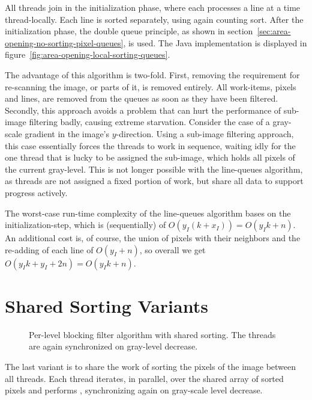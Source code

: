 All threads join in the initialization phase, where each processes a line at a
time thread-locally. Each line is sorted separately, using again counting
sort. After the initialization phase, the double queue principle, as shown in
section~\ref{sec:area-opening-no-sorting-pixel-queues}, is used. The Java
implementation is displayed in
figure~\ref{fig:area-opening-local-sorting-queues}.

The advantage of this algorithm is two-fold. First, removing the requirement for
re-scanning the image, or parts of it, is removed entirely. All work-items,
pixels and lines, are removed from the queues as soon as they have been
filtered. Secondly, this approach avoids a problem that can hurt the performance
of sub-image filtering badly, causing extreme starvation. Consider the case of a
gray-scale gradient in the image's $y$-direction. Using a sub-image filtering
approach, this case essentially forces the threads to work in sequence, waiting
idly for the one thread that is lucky to be assigned the sub-image, which holds
all pixels of the current gray-level. This is not longer possible with the
line-queues algorithm, as threads are not assigned a fixed portion of work, but
share all data to support progress actively.

The worst-case run-time complexity of the line-queues algorithm bases on the
initialization-step, which is (sequentially) of $O(y_I(k + x_I)) = O(y_Ik +
n)$. An additional cost is, of course, the union of pixels with their neighbors
and the re-adding of each line of $O(y_I + n)$, so overall we get $O(y_Ik + y_I
+ 2n) = O(y_Ik + n)$.

\section{Shared Sorting Variants}
\label{sec:area-opening-shared-sorting}

\begin{figure}
  \centering

  

  \caption[Per-level blocking filter algorithm with shared sorting.]{Per-level
    blocking filter algorithm with shared sorting. The threads are again
    synchronized on gray-level decrease.}
  \label{fig:area-opening-shared-sorting}
\end{figure}

The last variant is to share the work of sorting the pixels of the image between
all threads. Each thread iterates, in parallel, over the shared array of sorted
pixels and performs , synchronizing again on
gray-scale level decrease.

